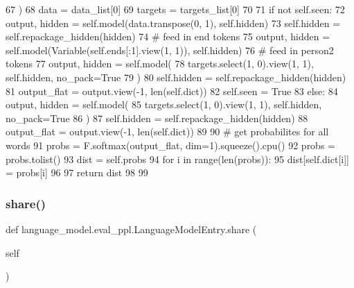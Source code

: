 \begin{DoxyCode}
67         )
68         data = data\_list[0]
69         targets = targets\_list[0]
70 
71         \textcolor{keywordflow}{if} \textcolor{keywordflow}{not} self.seen:
72             output, hidden = self.model(data.transpose(0, 1), self.hidden)
73             self.hidden = self.repackage\_hidden(hidden)
74             \textcolor{comment}{# feed in end tokens}
75             output, hidden = self.model(Variable(self.ends[:1].view(1, 1)), self.hidden)
76             \textcolor{comment}{# feed in person2 tokens}
77             output, hidden = self.model(
78                 targets.select(1, 0).view(1, 1), self.hidden, no\_pack=\textcolor{keyword}{True}
79             )
80             self.hidden = self.repackage\_hidden(hidden)
81             output\_flat = output.view(-1, len(self.dict))
82             self.seen = \textcolor{keyword}{True}
83         \textcolor{keywordflow}{else}:
84             output, hidden = self.model(
85                 targets.select(1, 0).view(1, 1), self.hidden, no\_pack=\textcolor{keyword}{True}
86             )
87             self.hidden = self.repackage\_hidden(hidden)
88             output\_flat = output.view(-1, len(self.dict))
89 
90         \textcolor{comment}{# get probabilites for all words}
91         probs = F.softmax(output\_flat, dim=1).squeeze().cpu()
92         probs = probs.tolist()
93         dist = self.probs
94         \textcolor{keywordflow}{for} i \textcolor{keywordflow}{in} range(len(probs)):
95             dist[self.dict[i]] = probs[i]
96 
97         \textcolor{keywordflow}{return} dist
98 
99 
\end{DoxyCode}
\mbox{\label{classlanguage__model_1_1eval__ppl_1_1LanguageModelEntry_a3a4b8adc4c891d9de5626b7c15e088a8}} 
\subsubsection{\texorpdfstring{share()}{share()}}
{\footnotesize\ttfamily def language\+\_\+model.\+eval\+\_\+ppl.\+Language\+Model\+Entry.\+share (\begin{DoxyParamCaption}\item[{}]{self }\end{DoxyParamCaption})}



